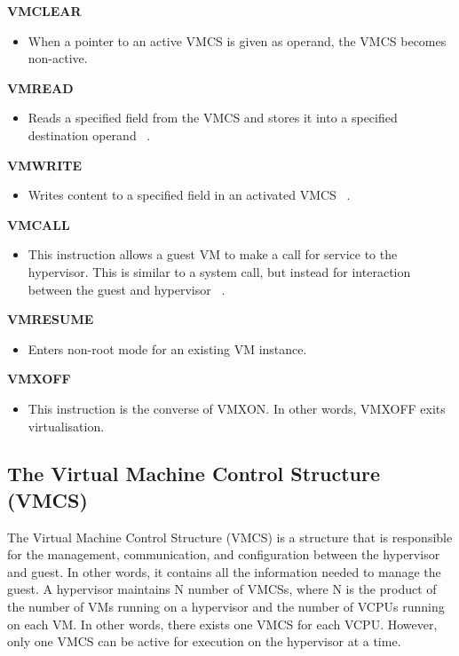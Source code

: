 \documentclass{report}
\begin{document}
\begin{spacing}{1.5}
{\textbf{VMCLEAR}
\begin{itemize}
\item[] {\large When a pointer to an active VMCS is given as operand, the VMCS becomes non-active. ~\cite{bhushanmodelling}}
\end{itemize}


\textbf{VMREAD}
\begin{itemize}
\item[] {\large Reads a specified field from the VMCS and stores it into a specified destination operand ~\cite{vmread}.}
\end{itemize}

\textbf{VMWRITE}
\begin{itemize}
\item[] {\large Writes content to a specified field in an activated VMCS ~\cite{vmwrite}.}
\end{itemize}

\textbf{VMCALL}
\begin{itemize}
\item[] {\large This instruction allows a guest VM to make a call for service to the hypervisor. This is similar to a system call, but instead for interaction between the guest and hypervisor ~\cite{vmcall}.}
\end{itemize}

\textbf{VMRESUME}
\begin{itemize}
\item[] Enters non-root mode for an existing VM instance.
\end{itemize}


\textbf{VMXOFF}
\begin{itemize}
\item[] {\large This instruction is the converse of VMXON. In other words, VMXOFF exits virtualisation. }
\end{itemize}

\leavevmode\newline
}



\subsection{The Virtual Machine Control Structure (VMCS)}

{\large
The Virtual Machine Control Structure (VMCS) is a structure that is responsible for the management, communication, and configuration between the hypervisor and guest. In other words, it contains all the information needed to manage the guest. A hypervisor maintains N number of VMCSs, where N is the product of the number of VMs running on a hypervisor and the number of VCPUs running on each VM. In other words, there exists one VMCS for each VCPU. However, only one VMCS can be active for execution on the hypervisor at a time. 
\newline
}


\end{spacing}
\end{document}
